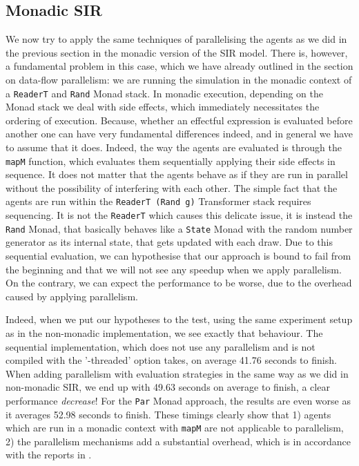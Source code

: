 \subsection{Monadic SIR}
We now try to apply the same techniques of parallelising the agents as we did in the previous section in the monadic version of the SIR model. There is, however, a fundamental problem in this case, which we have already outlined in the section on data-flow parallelism: we are running the simulation in the monadic context of a \texttt{ReaderT} and \texttt{Rand} Monad stack. In monadic execution, depending on the Monad stack we deal with side effects, which immediately necessitates the ordering of execution. Because, whether an effectful expression is evaluated before another one can have very fundamental differences indeed, and in general we have to assume that it does.
Indeed, the way the agents are evaluated is through the \texttt{mapM} function, which evaluates them sequentially applying their side effects in sequence. It does not matter that the agents behave as if they are run in parallel without the possibility of interfering with each other. The simple fact that the agents are run within the \texttt{ReaderT (Rand g)} Transformer stack requires sequencing. It is not the \texttt{ReaderT} which causes this delicate issue, it is instead the \texttt{Rand} Monad, that basically behaves like a \texttt{State} Monad with the random number generator as its internal state, that gets updated with each draw.
Due to this sequential evaluation, we can hypothesise that our approach is bound to fail from the beginning and that we will not see any speedup  when we apply parallelism. On the contrary, we can expect the performance to be worse, due to the overhead caused by applying parallelism.

Indeed, when we put our hypotheses to the test, using the same experiment setup as in the non-monadic implementation, we see exactly that behaviour. The sequential implementation, which does not use any parallelism and is not compiled with the '-threaded' option takes, on average 41.76 seconds to finish. When adding parallelism with evaluation strategies in the same way as we did in non-monadic SIR, we end up with 49.63 seconds on average to finish, a clear performance \textit{decrease}! For the \texttt{Par} Monad approach, the results are even worse as it averages 52.98 seconds to finish. These timings clearly show that 1) agents which are run in a monadic context with \texttt{mapM} are not applicable to parallelism, 2) the parallelism mechanisms add a substantial overhead, which is in accordance with the reports in \cite{marlow_parallel_2013}.

